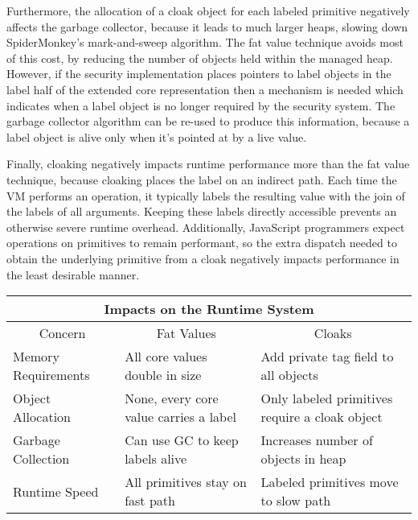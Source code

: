 \documentclass[11pt,onecolumn]{article}
\begin{document}
Furthermore, the allocation of a cloak object for each labeled primitive negatively affects the garbage collector, because it leads to much larger heaps, slowing down SpiderMonkey's mark-and-sweep algorithm.
The fat value technique avoids most of this cost, by reducing the number of objects held within the managed heap.
However, if the security implementation places pointers to label objects in the label half of the extended core representation then a mechanism is needed which indicates when a label object is no longer required by the security system.
The garbage collector algorithm can be re-used to produce this information, because a label object is alive only when it's pointed at by a live value.

Finally, cloaking negatively impacts runtime performance more than the fat value technique, because cloaking places the label on an indirect path.
Each time the VM performs an operation, it typically labels the resulting value with the join of the labels of all arguments.
Keeping these labels directly accessible prevents an otherwise severe runtime overhead.
Additionally, JavaScript programmers expect operations on primitives to remain performant, so the extra dispatch needed to obtain the underlying primitive from a cloak negatively impacts performance in the least desirable manner.

\medskip
\begin{adjustwidth}{-2in}{-2in}
\begin{center}
\begin{tabular}{l|l|l}
\toprule
\multicolumn{3}{c}{Impacts on the Runtime System} \\
\midrule
\multicolumn{1}{c}{Concern} & \multicolumn{1}{|c|}{Fat Values} & \multicolumn{1}{c}{Cloaks} \\
\midrule
Memory Requirements & All core values double in size & Add private tag field to all objects \\
Object Allocation   & None, every core value carries a label & Only labeled primitives require a cloak object \\
Garbage Collection  & Can use GC to keep labels alive & Increases number of objects in heap \\
Runtime Speed       & All primitives stay on fast path & Labeled primitives move to slow path \\
\bottomrule
\end{tabular}
\end{center}
\end{adjustwidth}
\medskip
\end{document}
